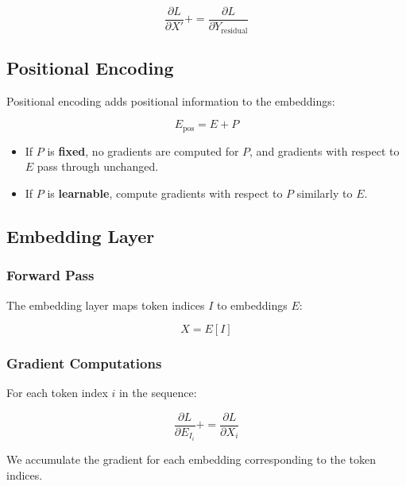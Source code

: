 \documentclass{article}
\begin{document}
\begin{equation}
    \frac{\partial L}{\partial X'} += \frac{\partial L}{\partial Y_{\text{residual}}}
\end{equation}

\subsection{Positional Encoding}

Positional encoding adds positional information to the embeddings:

\begin{equation}
    E_{\text{pos}} = E + P
\end{equation}

\begin{itemize}
    \item If $P$ is \textbf{fixed}, no gradients are computed for $P$, and gradients with respect to $E$ pass through unchanged.
    \item If $P$ is \textbf{learnable}, compute gradients with respect to $P$ similarly to $E$.
\end{itemize}

\subsection{Embedding Layer}

\subsubsection{Forward Pass}

The embedding layer maps token indices $I$ to embeddings $E$:

\begin{equation}
    X = E[I]
\end{equation}

\subsubsection{Gradient Computations}

For each token index $i$ in the sequence:

\begin{equation}
    \frac{\partial L}{\partial E_{I_i}} += \frac{\partial L}{\partial X_i}
\end{equation}

We accumulate the gradient for each embedding corresponding to the token indices.
\end{document}
